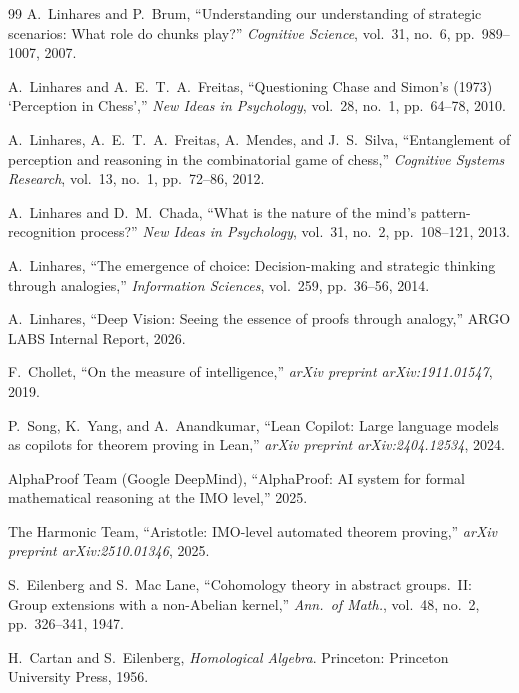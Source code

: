 \documentclass[11pt]{article}
\theoremstyle{definition}
\theoremstyle{remark}
\begin{document}
\begin{thebibliography}{99}
A.~Linhares and P.~Brum, ``Understanding our understanding of strategic scenarios: What role do chunks play?'' \emph{Cognitive Science}, vol.~31, no.~6, pp.~989--1007, 2007.

A.~Linhares and A.~E.~T.~A.~Freitas, ``Questioning Chase and Simon's (1973) `Perception in Chess','' \emph{New Ideas in Psychology}, vol.~28, no.~1, pp.~64--78, 2010.

A.~Linhares, A.~E.~T.~A.~Freitas, A.~Mendes, and J.~S.~Silva, ``Entanglement of perception and reasoning in the combinatorial game of chess,'' \emph{Cognitive Systems Research}, vol.~13, no.~1, pp.~72--86, 2012.

A.~Linhares and D.~M.~Chada, ``What is the nature of the mind's pattern-recognition process?'' \emph{New Ideas in Psychology}, vol.~31, no.~2, pp.~108--121, 2013.

A.~Linhares, ``The emergence of choice: Decision-making and strategic thinking through analogies,'' \emph{Information Sciences}, vol.~259, pp.~36--56, 2014.

A.~Linhares, ``Deep Vision: Seeing the essence of proofs through analogy,'' ARGO LABS Internal Report, 2026.


F.~Chollet, ``On the measure of intelligence,'' \emph{arXiv preprint arXiv:1911.01547}, 2019.

P.~Song, K.~Yang, and A.~Anandkumar,
``Lean Copilot: Large language models as copilots for theorem proving
in Lean,''
\emph{arXiv preprint arXiv:2404.12534}, 2024.

AlphaProof Team (Google DeepMind),
``AlphaProof: AI system for formal mathematical reasoning at the
IMO level,'' 2025.

The Harmonic Team,
``Aristotle: IMO-level automated theorem proving,''
\emph{arXiv preprint arXiv:2510.01346}, 2025.

S.~Eilenberg and S.~Mac Lane,
``Cohomology theory in abstract groups.~II: Group extensions with a
non-Abelian kernel,''
\emph{Ann.\ of Math.}, vol.~48, no.~2, pp.~326--341, 1947.

H.~Cartan and S.~Eilenberg,
\emph{Homological Algebra}.
Princeton: Princeton University Press, 1956.


\end{thebibliography}
\end{document}
